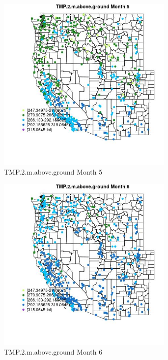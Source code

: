 \begin{figure} 
\centering  
\includegraphics[width=0.77\textwidth]{Code_Outputs/Report_ML_input_PM25_Step4_part_e_de_duplicated_aves_compiled_2019-05-14wNAs_MapObsMo5TMP2maboveground.jpg} 
\caption{\label{fig:Report_ML_input_PM25_Step4_part_e_de_duplicated_aves_compiled_2019-05-14wNAsMapObsMo5TMP2maboveground}TMP.2.m.above.ground Month 5} 
\end{figure} 
 

\clearpage 

\begin{figure} 
\centering  
\includegraphics[width=0.77\textwidth]{Code_Outputs/Report_ML_input_PM25_Step4_part_e_de_duplicated_aves_compiled_2019-05-14wNAs_MapObsMo6TMP2maboveground.jpg} 
\caption{\label{fig:Report_ML_input_PM25_Step4_part_e_de_duplicated_aves_compiled_2019-05-14wNAsMapObsMo6TMP2maboveground}TMP.2.m.above.ground Month 6} 
\end{figure} 
 

